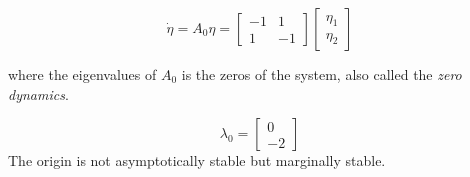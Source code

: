 \begin{equation}
        \dot{\eta} = A_0 \eta = 
        \begin{bmatrix}
                -1 & 1 \\
                1 & -1
        \end{bmatrix}
        \begin{bmatrix}
                \eta_1 \\
                \eta_2
        \end{bmatrix}
\end{equation}

where the eigenvalues of $A_0$ is the zeros of the system, also called the \textit{zero dynamics}.

\begin{equation}
        \lambda_0 = 
        \begin{bmatrix}
                0 \\
                -2 
        \end{bmatrix}
\end{equation}
The origin is not asymptotically stable but marginally stable.